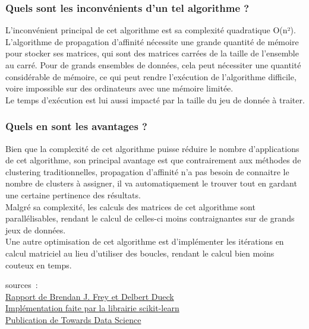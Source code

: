 
    \subsubsection{Quels sont les inconvénients d'un tel algorithme ?}
    \hspace*{13px} L'inconvénient principal de cet algorithme est sa complexité quadratique O(n²). L'algorithme de propagation d'affinité nécessite une grande quantité de mémoire pour stocker ses matrices, qui sont des matrices carrées de la taille de l'ensemble au carré. Pour de grands ensembles de données, cela peut nécessiter une quantité considérable de mémoire, ce qui peut rendre l'exécution de l'algorithme difficile, voire impossible sur des ordinateurs avec une mémoire limitée.\\
    Le temps d'exécution est lui aussi impacté par la taille du jeu de donnée à traiter.
    
    \subsubsection{Quels en sont les avantages ?}
    
    \hspace*{13px} Bien que la complexité de cet algorithme puisse réduire le nombre d'applications de cet algorithme, son principal avantage est que contrairement aux méthodes de clustering traditionnelles, propagation d'affinité n'a pas besoin de connaitre le nombre de clusters à assigner, il va automatiquement le trouver tout en gardant une certaine pertinence des résultats.\\
    Malgré sa complexité, les calculs des matrices de cet algorithme sont parallélisables, rendant le calcul de celles-ci moins contraignantes sur de grands jeux de données.\\
    Une autre optimisation de cet algorithme est d'implémenter les itérations en calcul matriciel au lieu d'utiliser des boucles, rendant le calcul bien moins couteux en temps.
    
sources :\\
\href{https://utstat.toronto.edu/reid/sta414/frey-affinity.pdf}{Rapport de Brendan J. Frey et Delbert Dueck}\\
\href{https://github.com/scikit-learn/scikit-learn/blob/main/sklearn/cluster/_affinity_propagation.py}{Implémentation faite par la librairie  scikit-learn}\\
\href{https://towardsdatascience.com/unsupervised-machine-learning-affinity-propagation-algorithm-explained-d1fef85f22c8}{Publication de Towards Data Science}\\

